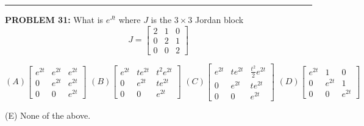 \documentclass[12pt]{amsart}
\newcommand{\divider}{
  \vspace{-1em} %
  \noindent
  \raisebox{-0.15ex}{\textbullet}%
  \hspace{0.5em}%
  \rule[0.5ex]{0.95\textwidth}{1.0pt}%
  \hspace{0.5em}%
  \raisebox{-0.15ex}{\textbullet}%
  \vspace{0em} %
}
\begin{document}
{\divider


{\bf PROBLEM 31:}
% 
What is $e^{Jt}$ where $J$ is the $3 \times 3$ Jordan block
$$J = \begin{bmatrix} 2 & 1 & 0 \\ 0 & 2 & 1 \\ 0 & 0 & 2 \end{bmatrix}$$

\[
(A) \begin{bmatrix} e^{2t} & e^{2t} & e^{2t} \\ 0 & e^{2t} & e^{2t} \\ 0 & 0 & e^{2t} \end{bmatrix}
\,\,(B) \begin{bmatrix} e^{2t} & te^{2t} & t^2e^{2t} \\ 0 & e^{2t} & te^{2t} \\ 0 & 0 & e^{2t} \end{bmatrix}
\,\,(C) \begin{bmatrix} e^{2t} & te^{2t} & \frac{t^2}{2}e^{2t} \\ 0 & e^{2t} & te^{2t} \\ 0 & 0 & e^{2t} \end{bmatrix}
\,\,(D) \begin{bmatrix} e^{2t} & 1 & 0 \\ 0 & e^{2t} & 1 \\ 0 & 0 & e^{2t} \end{bmatrix}
\]

(E) None of the above.


}
\end{document}

